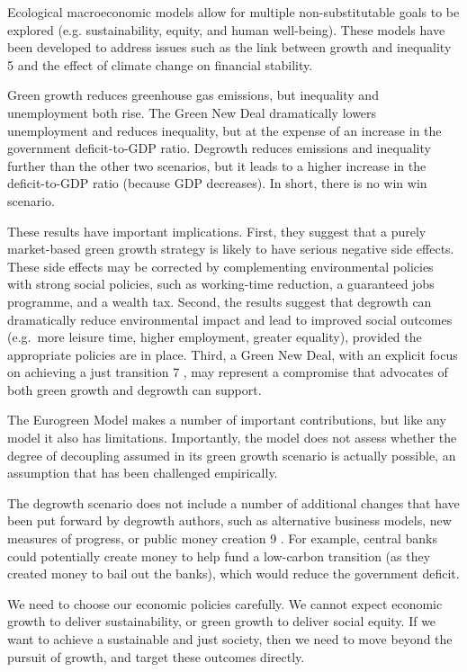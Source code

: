 \documentclass[
]{book}
\begin{document}
Ecological macroeconomic models allow for multiple non-substitutable goals to be explored (e.g.
sustainability, equity, and human well-being). These models have been developed to address issues
such as the link between growth and inequality 5 and the effect of climate change on financial
stability.

Green growth reduces greenhouse gas emissions, but inequality and unemployment both rise. The
Green New Deal dramatically lowers unemployment and reduces inequality, but at the expense of an
increase in the government deficit-to-GDP ratio. Degrowth reduces emissions and inequality further
than the other two scenarios, but it leads to a higher increase in the deficit-to-GDP ratio (because
GDP decreases). In short, there is no win win scenario.

These results have important implications. First, they suggest that a purely market-based green
growth strategy is likely to have serious negative side effects. These side effects may be corrected by
complementing environmental policies with strong social policies, such as working-time reduction, a
guaranteed jobs programme, and a wealth tax. Second, the results suggest that degrowth can
dramatically reduce environmental impact and lead to improved social outcomes (e.g.~more leisure
time, higher employment, greater equality), provided the appropriate policies are in place. Third, a
Green New Deal, with an explicit focus on achieving a just transition 7 , may represent a compromise
that advocates of both green growth and degrowth can support.

The Eurogreen Model makes a number of important contributions, but like any model it also has
limitations. Importantly, the model does not assess whether the degree of decoupling assumed in its
green growth scenario is actually possible, an assumption that has been challenged empirically.

The degrowth scenario does not include a
number of additional changes that have been put forward by degrowth authors, such as alternative
business models, new measures of progress, or public money creation 9 . For example, central banks
could potentially create money to help fund a low-carbon transition (as they created money to bail
out the banks), which would reduce the government deficit.

We need to choose our
economic policies carefully. We cannot expect economic growth to deliver sustainability, or green
growth to deliver social equity. If we want to achieve a sustainable and just society, then we need to
move beyond the pursuit of growth, and target these outcomes directly.
\end{document}
